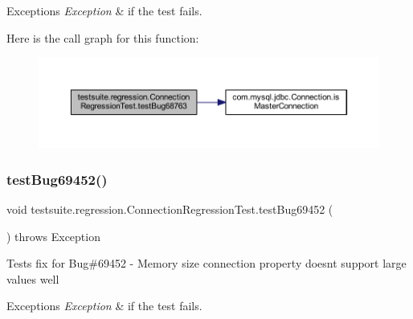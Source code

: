 \begin{DoxyExceptions}{Exceptions}
{\em Exception} & if the test fails. \\
\hline
\end{DoxyExceptions}
Here is the call graph for this function\+:
\nopagebreak
\begin{figure}[H]
\begin{center}
\leavevmode
\includegraphics[width=350pt]{classtestsuite_1_1regression_1_1_connection_regression_test_ad20cb3d4d184371c5cbf7e540726e6a6_cgraph}
\end{center}
\end{figure}
\mbox{\label{classtestsuite_1_1regression_1_1_connection_regression_test_a83cf8c588a6543301dab7d3afa57042b}} 
\subsubsection{\texorpdfstring{test\+Bug69452()}{testBug69452()}}
{\footnotesize\ttfamily void testsuite.\+regression.\+Connection\+Regression\+Test.\+test\+Bug69452 (\begin{DoxyParamCaption}{ }\end{DoxyParamCaption}) throws Exception}

Tests fix for Bug\#69452 -\/ Memory size connection property doesn\textquotesingle{}t support large values well


\begin{DoxyExceptions}{Exceptions}
{\em Exception} & if the test fails. \\
\hline
\end{DoxyExceptions}
\mbox{\label{classtestsuite_1_1regression_1_1_connection_regression_test_ac8bd9a129a96fb8c9d9c220369e1a5b2}} 
